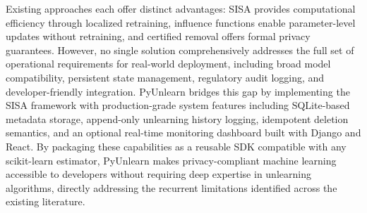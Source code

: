 Existing approaches each offer distinct advantages: SISA \cite{bourtoule2021machine} provides computational efficiency through localized retraining, influence functions \cite{guo2020certified} enable parameter-level updates without retraining, and certified removal offers formal privacy guarantees. However, no single solution comprehensively addresses the full set of operational requirements for real-world deployment, including broad model compatibility, persistent state management, regulatory audit logging, and developer-friendly integration. PyUnlearn bridges this gap by implementing the SISA framework with production-grade system features including SQLite-based metadata storage, append-only unlearning history logging, idempotent deletion semantics, and an optional real-time monitoring dashboard built with Django and React. By packaging these capabilities as a reusable SDK compatible with any scikit-learn estimator, PyUnlearn makes privacy-compliant machine learning accessible to developers without requiring deep expertise in unlearning algorithms, directly addressing the recurrent limitations identified across the existing literature.
